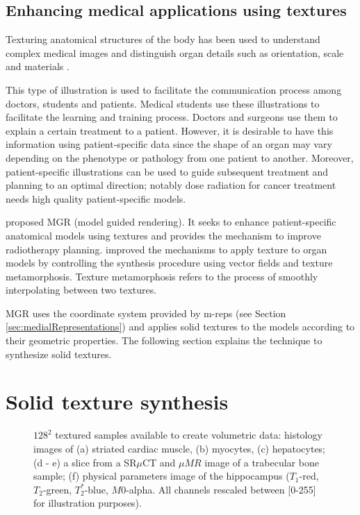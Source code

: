 \subsection{Enhancing medical applications using textures}

Texturing anatomical structures of the body has been used to 
understand complex medical images and distinguish 
organ details such as orientation, scale and materials \cite{netter2010atlas}.

This type of illustration is used to facilitate the communication process 
among doctors, students and patients. 
Medical students use these illustrations to facilitate the learning and training process.
Doctors and surgeons use them to explain a certain treatment to a patient.
However, it is desirable to have this information using patient-specific
data since the shape of an organ may vary depending 
on the phenotype or pathology from one patient to another. 
Moreover, patient-specific illustrations can be used to guide subsequent 
treatment and planning to an optimal direction; notably dose radiation 
for cancer treatment needs high quality patient-specific models.

\cite{merck2009model} proposed MGR (model guided rendering). It seeks 
to enhance patient-specific anatomical models
using textures and provides the mechanism 
to improve radiotherapy planning. 
\cite{kabul2011optimal} improved the mechanisms to apply texture 
to organ models by controlling the synthesis procedure using vector 
fields and texture metamorphosis.
Texture metamorphosis refers to the process of smoothly interpolating between two
textures. 

MGR uses the coordinate system provided by m-reps (see Section \ref{sec:medialRepresentations}) 
and applies solid textures to the models according to their geometric 
properties.
The following section explains the technique to synthesize solid textures.

\section{Solid texture synthesis}
\label{sec:solidTextureImplementation}
\begin{figure*}
 \centering 
 \caption[Exemplar textures.]{$128^2$ textured samples available to create volumetric data: 
          histology images of (a) striated cardiac muscle, (b) myocytes, 
	  (c) hepatocytes; (d - e) a slice from a SR$\mu$CT and $\mu{MR}$ image of a trabecular bone sample; (f) physical parameters image of the hippocampus 
	  ($T_1$-red, $T_2$-green, $T_2^*$-blue, $M0$-alpha. All channels rescaled between [0-255] for illustration purposes).
          }
 \label{fig:sampleimages}
\end{figure*}


